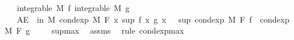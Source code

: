 \begin{isabellebody}
\ \ \ {\isachardoublequoteopen}integrable\ M\ f{\isachardoublequoteclose}\ {\isachardoublequoteopen}integrable\ M\ g{\isachardoublequoteclose}\isanewline
\ \ \ {\isachardoublequoteopen}AE\ {\isasymxi}\ in\ M{\isachardot}{\kern0pt}\ cond{\isacharunderscore}{\kern0pt}exp\ M\ F\ {\isacharparenleft}{\kern0pt}{\isasymlambda}x{\isachardot}{\kern0pt}\ sup\ {\isacharparenleft}{\kern0pt}f\ x{\isacharparenright}{\kern0pt}\ {\isacharparenleft}{\kern0pt}g\ x{\isacharparenright}{\kern0pt}{\isacharparenright}{\kern0pt}\ {\isasymxi}\ {\isasymge}\ sup\ {\isacharparenleft}{\kern0pt}cond{\isacharunderscore}{\kern0pt}exp\ M\ F\ f\ {\isasymxi}{\isacharparenright}{\kern0pt}\ {\isacharparenleft}{\kern0pt}cond{\isacharunderscore}{\kern0pt}exp\ M\ F\ g\ {\isasymxi}{\isacharparenright}{\kern0pt}{\isachardoublequoteclose}\isanewline
%
\isadelimproof
\ \ %
\endisadelimproof
%
\isatagproof
{}\isamarkupfalse%
\ sup{\isacharunderscore}{\kern0pt}max\ \isamarkupfalse%
\ assms\ \isamarkupfalse%
\ {\isacharparenleft}{\kern0pt}rule\ cond{\isacharunderscore}{\kern0pt}exp{\isacharunderscore}{\kern0pt}max{\isacharparenright}{\kern0pt}%
\endisatagproof
{\isafoldproof}%
%
\isadelimproof
\isanewline
%
\endisadelimproof
\isanewline
{}\isamarkupfalse%
\isanewline
%
\isadelimtheory
\isanewline
%
\endisadelimtheory
%
\isatagtheory
{}\isamarkupfalse%
%
\endisatagtheory
{\isafoldtheory}%
%
\isadelimtheory
%
\endisadelimtheory
%
\end{isabellebody}%
\endinput
